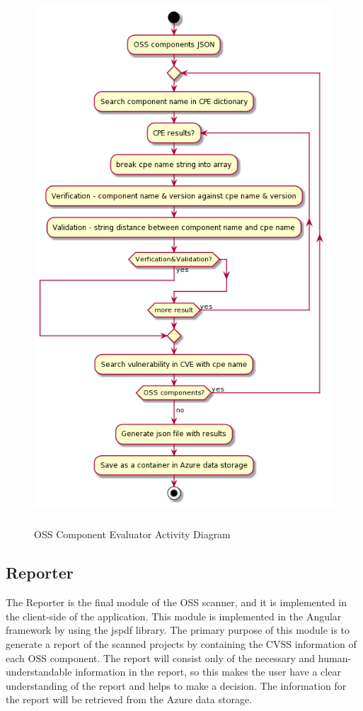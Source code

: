 \begin{figure}[h!]
	\includegraphics[width=15cm,height=20cm]{includes/OSS_Evaluator_Activity_Diagram.png}
	\centering
	\caption{\acs{OSS} Component Evaluator Activity Diagram}
	\label{fig:Evaluator_Activity_Diagram}
\end{figure} 
\newpage                                                                                      \newpage            
\subsection{Reporter}
The Reporter is the final module of the \acs{OSS} scanner, and it is implemented in the client-side of the application. This module is implemented in the Angular framework by using the jspdf library. The primary purpose of this module is to generate a report of the scanned projects by containing the \acs{CVSS} information of each \acs{OSS} component. The report will consist only of the necessary and human-understandable information in the report, so this makes the user have a clear understanding of the report and helps to make a decision. The information for the report will be retrieved from the Azure data storage.

